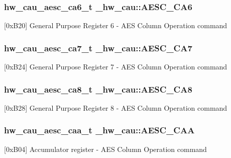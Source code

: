\subsubsection[{\texorpdfstring{A\+E\+S\+C\+\_\+\+C\+A6}{AESC_CA6}}]{ {\bf hw\+\_\+cau\+\_\+aesc\+\_\+ca6\+\_\+t} \+\_\+hw\+\_\+cau\+::\+A\+E\+S\+C\+\_\+\+C\+A6}\hypertarget{struct__hw__cau_a64729bdc5a0280db7df535e9458d9a34}{}\label{struct__hw__cau_a64729bdc5a0280db7df535e9458d9a34}
\mbox{[}0x\+B20\mbox{]} General Purpose Register 6 -\/ A\+ES Column Operation command 
\subsubsection[{\texorpdfstring{A\+E\+S\+C\+\_\+\+C\+A7}{AESC_CA7}}]{ {\bf hw\+\_\+cau\+\_\+aesc\+\_\+ca7\+\_\+t} \+\_\+hw\+\_\+cau\+::\+A\+E\+S\+C\+\_\+\+C\+A7}\hypertarget{struct__hw__cau_af684eda56eda2e1be9d13eb2473ccdd0}{}\label{struct__hw__cau_af684eda56eda2e1be9d13eb2473ccdd0}
\mbox{[}0x\+B24\mbox{]} General Purpose Register 7 -\/ A\+ES Column Operation command 
\subsubsection[{\texorpdfstring{A\+E\+S\+C\+\_\+\+C\+A8}{AESC_CA8}}]{ {\bf hw\+\_\+cau\+\_\+aesc\+\_\+ca8\+\_\+t} \+\_\+hw\+\_\+cau\+::\+A\+E\+S\+C\+\_\+\+C\+A8}\hypertarget{struct__hw__cau_a98ad30fc8b5fad738b3af2f92b16f08d}{}\label{struct__hw__cau_a98ad30fc8b5fad738b3af2f92b16f08d}
\mbox{[}0x\+B28\mbox{]} General Purpose Register 8 -\/ A\+ES Column Operation command 
\subsubsection[{\texorpdfstring{A\+E\+S\+C\+\_\+\+C\+AA}{AESC_CAA}}]{ {\bf hw\+\_\+cau\+\_\+aesc\+\_\+caa\+\_\+t} \+\_\+hw\+\_\+cau\+::\+A\+E\+S\+C\+\_\+\+C\+AA}\hypertarget{struct__hw__cau_a342b57f6f5b1d692698ad00d241699c5}{}\label{struct__hw__cau_a342b57f6f5b1d692698ad00d241699c5}
\mbox{[}0x\+B04\mbox{]} Accumulator register -\/ A\+ES Column Operation command 
